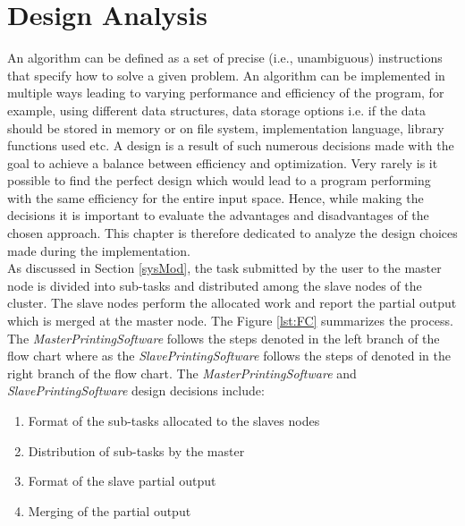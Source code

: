 \chapter{Design Analysis} \label{DA}
An algorithm can be defined as a set of precise (i.e., unambiguous) instructions that specify how to solve a given problem. An algorithm can be implemented in multiple ways leading to varying performance and efficiency of the program, for example, using different data structures, data storage options i.e. if the data should be stored in memory or on file system, implementation language, library functions used etc. A design is a result of such numerous decisions made with the goal to achieve a balance between efficiency and optimization. Very rarely is it possible to find the perfect design which would lead to a program performing with the same efficiency for the entire input space. Hence, while making the decisions it is important to evaluate the advantages and disadvantages of the chosen approach. This chapter is therefore dedicated to analyze the design choices made during the implementation. \\

As discussed in Section \ref{sysMod}, the task submitted by the user to the master node is divided into sub-tasks and distributed among the slave nodes of the cluster. The slave nodes perform the allocated work and report the partial output which is merged at the master node. The Figure \ref{lst:FC} summarizes the process. The \textit{MasterPrintingSoftware} follows the steps denoted in the left branch of the flow chart where as the \textit{SlavePrintingSoftware} follows the steps of denoted in the right branch of the flow chart. The \textit{MasterPrintingSoftware} and \textit{SlavePrintingSoftware} design decisions include:
\begin{enumerate}
\item Format of the sub-tasks allocated to the slaves nodes
\item Distribution of sub-tasks by the master
\item Format of the slave partial output 
\item Merging of the partial output 
\end{enumerate}

